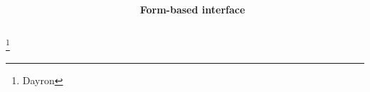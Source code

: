\documentclass[14pt]{beamer}
\begin{document}
\begin{frame}
\begin{columns}
\begin{column}{0.5\textwidth}
\begin{center}
\end{center}
\end{column}
\begin{column}{0.5\textwidth}
\textbf{Form-based interface}
\begin{center}


\end{center}
\end{column}
\end{columns}
\footnote{Dayron}
\end{frame}
\end{document}
